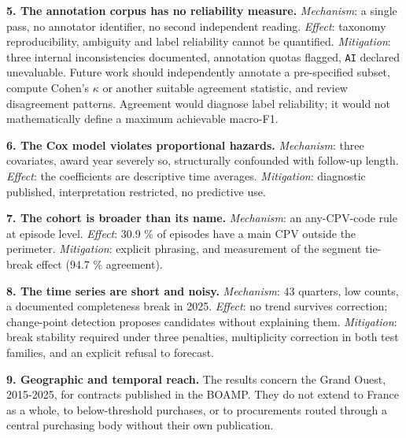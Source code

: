 \textbf{5. The annotation corpus has no reliability measure.} \emph{Mechanism}: a single pass, no annotator identifier, no second independent reading. \emph{Effect}: taxonomy reproducibility, ambiguity and label reliability cannot be quantified. \emph{Mitigation}: three internal inconsistencies documented, annotation quotas flagged, \texttt{AI} declared unevaluable. Future work should independently annotate a pre-specified subset, compute Cohen's $\kappa$ or another suitable agreement statistic, and review disagreement patterns. Agreement would diagnose label reliability; it would not mathematically define a maximum achievable macro-F1.

\textbf{6. The Cox model violates proportional hazards.} \emph{Mechanism}: three covariates, award year severely so, structurally confounded with follow-up length. \emph{Effect}: the coefficients are descriptive time averages. \emph{Mitigation}: diagnostic published, interpretation restricted, no predictive use.

\textbf{7. The cohort is broader than its name.} \emph{Mechanism}: an any-CPV-code rule at episode level. \emph{Effect}: 30.9 \% of episodes have a main CPV outside the perimeter. \emph{Mitigation}: explicit phrasing, and measurement of the segment tie-break effect (94.7 \% agreement).

\textbf{8. The time series are short and noisy.} \emph{Mechanism}: 43 quarters, low counts, a documented completeness break in 2025. \emph{Effect}: no trend survives correction; change-point detection proposes candidates without explaining them. \emph{Mitigation}: break stability required under three penalties, multiplicity correction in both test families, and an explicit refusal to forecast.

\textbf{9. Geographic and temporal reach.} The results concern the Grand Ouest, 2015-2025, for contracts published in the BOAMP. They do not extend to France as a whole, to below-threshold purchases, or to procurements routed through a central purchasing body without their own publication.
